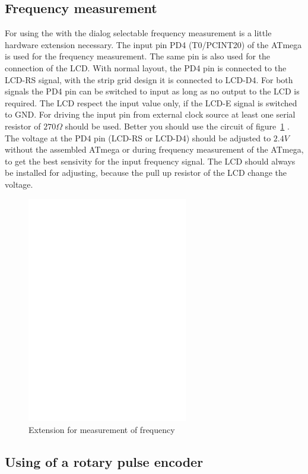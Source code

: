 \subsection{Frequency measurement}
\label{sec:frequency_counter}

For using the with the dialog selectable frequency measurement is a little hardware extension
necessary. The input pin PD4 (T0/PCINT20) of the ATmega is used for the frequency measurement.
The same pin is also used for the connection of the LCD. With normal layout, the PD4 pin is connected
to the LCD-RS signal, with the strip grid design it is connected to LCD-D4.
For both signals the PD4 pin can be switched to input as long as no output to the LCD is
required. The LCD respect the input value only, if the LCD-E signal is switched to GND.
For driving the input pin from external clock source at least one serial resistor of \(270\Omega\) should be used.
Better you should use the circuit of figure~\ref{fig:FreqMes} .
The voltage at the PD4 pin (LCD-RS or LCD-D4) should be adjusted to \(2.4V\) without the assembled ATmega
or during frequency measurement of the ATmega, to get the best sensivity for the input frequency signal.
The LCD should always be installed for adjusting, because the pull up resistor of the LCD change the voltage.

\begin{figure}[H]
\centering
\includegraphics[width=7cm]{../FIG/Frequency_addon.eps}
\caption{Extension for measurement of frequency}
\label{fig:FreqMes}
\end{figure}

\subsection{Using of a rotary pulse encoder}

